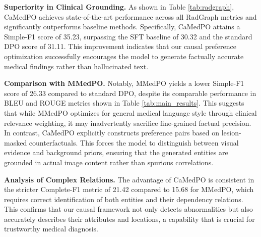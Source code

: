 \begin{table}[t]
\centering
\caption{\textbf{Clinical Factuality Evaluation on IU-Xray.} We report RadGraph F1 scores to assess the precision of extracted clinical entities and relations. $^s$ denotes the model enhanced with SFT. CaMedPO significantly outperforms baselines in capturing correct medical facts.}
\label{tab:radgraph}
\end{table}

\noindent\textbf{Superiority in Clinical Grounding.} As shown in Table \ref{tab:radgraph}, CaMedPO achieves state-of-the-art performance across all RadGraph metrics and significantly outperforms baseline methods. Specifically, CaMedPO attains a Simple-F1 score of 35.23, surpassing the SFT baseline of 30.32 and the standard DPO score of 31.11. This improvement indicates that our causal preference optimization successfully encourages the model to generate factually accurate medical findings rather than hallucinated text.

\noindent\textbf{Comparison with MMedPO.} Notably, MMedPO yields a lower Simple-F1 score of 26.33 compared to standard DPO, despite its comparable performance in BLEU and ROUGE metrics shown in Table \ref{tab:main_results}. This suggests that while MMedPO optimizes for general medical language style through clinical relevance weighting, it may inadvertently sacrifice fine-grained factual precision. In contrast, CaMedPO explicitly constructs preference pairs based on lesion-masked counterfactuals. This forces the model to distinguish between visual evidence and background priors, ensuring that the generated entities are grounded in actual image content rather than spurious correlations.

\noindent\textbf{Analysis of Complex Relations.} The advantage of CaMedPO is consistent in the stricter Complete-F1 metric of 21.42 compared to 15.68 for MMedPO, which requires correct identification of both entities and their dependency relations. This confirms that our causal framework not only detects abnormalities but also accurately describes their attributes and locations, a capability that is crucial for trustworthy medical diagnosis.

